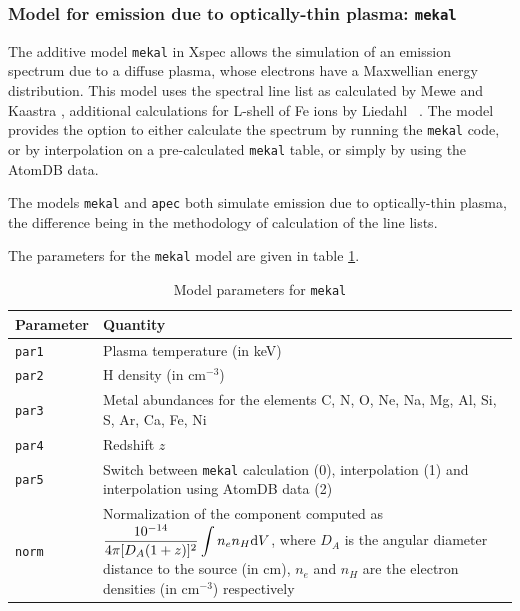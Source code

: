 			\subsubsection{Model for emission due to optically-thin plasma: \texttt{mekal}}
				The additive model \texttt{mekal} in Xspec allows the simulation of an emission spectrum due to a diffuse plasma, whose electrons have a Maxwellian energy distribution. This model uses the spectral line list as calculated by Mewe and Kaastra \cite{meka}, additional calculations for L-shell of Fe ions by Liedahl \etal\ \cite{liedahl}. The model provides the option to either calculate the spectrum by running the \texttt{mekal} code, or by interpolation on a pre-calculated \texttt{mekal} table, or simply by using the AtomDB data.
				
				The models \texttt{mekal} and \texttt{apec} both simulate emission due to optically-thin plasma, the difference being in the methodology of calculation of the line lists.
				
				The parameters for the \texttt{mekal} model are given in table \ref{param:mekal}.
				\begin{table}[h!]
					\centering
					\caption{Model parameters for \texttt{mekal}}
					\label{param:mekal}
					\begin{tabular}{p{}p{}}
						\hline
						\textbf{Parameter} & \textbf{Quantity} \\ \hline
						{\texttt{par1}} & {Plasma temperature (in keV)} \\ %
						{\texttt{par2}} & {H density (in cm$^{-3}$)} \\ %
						{\texttt{par3}} & {Metal abundances for the elements C, N, O, Ne, Na, Mg, Al, Si, S, Ar, Ca, Fe, Ni} \\ %
						{\texttt{par4}} & {Redshift $z$} \\ %
						{\texttt{par5}} & {Switch between \texttt{mekal} calculation (0), interpolation (1) and interpolation using AtomDB data (2)} \\ %
						{\texttt{norm}} & {Normalization of the component computed as $\displaystyle\dfrac{10^{-14}}{4\pi[D_A(1+z)]^2}\int{n_en_H\mathrm{d}V}$, where $D_A$ is the angular diameter distance to the source (in cm), $n_e$ and $n_H$ are the electron densities (in cm$^{-3}$) respectively} \\ \hline
					\end{tabular}
				\end{table}
			
